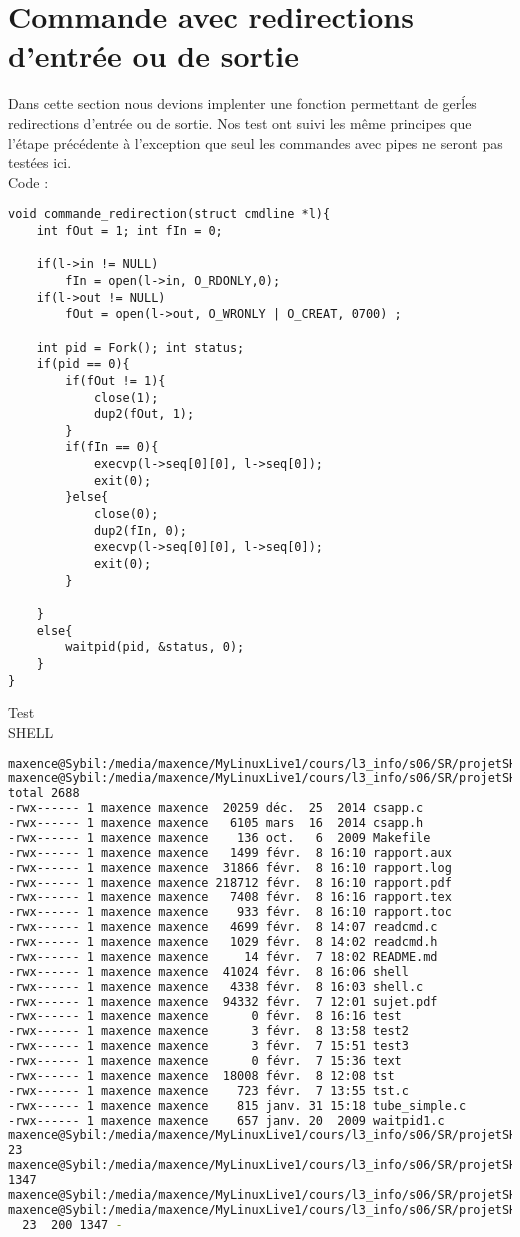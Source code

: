 \documentclass{report}
\begin{document}
		\section{Commande avec redirections d'entr\'ee ou de sortie}
			Dans cette section nous devions implenter une fonction permettant de ger\'les redirections d'entr\'ee ou de sortie. Nos test ont suivi les m\^eme principes que l'\'etape pr\'ec\'edente \`a l'exception que seul les commandes avec pipes ne seront pas test\'ees ici. \\ Code :
			\begin{lstlisting}
void commande_redirection(struct cmdline *l){
	int fOut = 1; int fIn = 0;

	if(l->in != NULL)
		fIn = open(l->in, O_RDONLY,0);
	if(l->out != NULL)
		fOut = open(l->out, O_WRONLY | O_CREAT, 0700) ;

	int pid = Fork(); int status;
	if(pid == 0){
		if(fOut != 1){
			close(1);
			dup2(fOut, 1);
		}
		if(fIn == 0){
			execvp(l->seq[0][0], l->seq[0]);
			exit(0);
		}else{
			close(0);
			dup2(fIn, 0);
			execvp(l->seq[0][0], l->seq[0]);
			exit(0);
		}
		
	}
	else{
		waitpid(pid, &status, 0);
	}
}
			\end{lstlisting}
			Test \\ SHELL
			\begin{lstlisting}[frame=single,basicstyle=\footnotesize,language=bash]
maxence@Sybil:/media/maxence/MyLinuxLive1/cours/l3_info/s06/SR/projetSHELL$ ls -l > test
maxence@Sybil:/media/maxence/MyLinuxLive1/cours/l3_info/s06/SR/projetSHELL$ cat test
total 2688
-rwx------ 1 maxence maxence  20259 déc.  25  2014 csapp.c
-rwx------ 1 maxence maxence   6105 mars  16  2014 csapp.h
-rwx------ 1 maxence maxence    136 oct.   6  2009 Makefile
-rwx------ 1 maxence maxence   1499 févr.  8 16:10 rapport.aux
-rwx------ 1 maxence maxence  31866 févr.  8 16:10 rapport.log
-rwx------ 1 maxence maxence 218712 févr.  8 16:10 rapport.pdf
-rwx------ 1 maxence maxence   7408 févr.  8 16:16 rapport.tex
-rwx------ 1 maxence maxence    933 févr.  8 16:10 rapport.toc
-rwx------ 1 maxence maxence   4699 févr.  8 14:07 readcmd.c
-rwx------ 1 maxence maxence   1029 févr.  8 14:02 readcmd.h
-rwx------ 1 maxence maxence     14 févr.  7 18:02 README.md
-rwx------ 1 maxence maxence  41024 févr.  8 16:06 shell
-rwx------ 1 maxence maxence   4338 févr.  8 16:03 shell.c
-rwx------ 1 maxence maxence  94332 févr.  7 12:01 sujet.pdf
-rwx------ 1 maxence maxence      0 févr.  8 16:16 test
-rwx------ 1 maxence maxence      3 févr.  8 13:58 test2
-rwx------ 1 maxence maxence      3 févr.  7 15:51 test3
-rwx------ 1 maxence maxence      0 févr.  7 15:36 text
-rwx------ 1 maxence maxence  18008 févr.  8 12:08 tst
-rwx------ 1 maxence maxence    723 févr.  7 13:55 tst.c
-rwx------ 1 maxence maxence    815 janv. 31 15:18 tube_simple.c
-rwx------ 1 maxence maxence    657 janv. 20  2009 waitpid1.c
maxence@Sybil:/media/maxence/MyLinuxLive1/cours/l3_info/s06/SR/projetSHELL$ wc -l < test
23
maxence@Sybil:/media/maxence/MyLinuxLive1/cours/l3_info/s06/SR/projetSHELL$ wc -c < test
1347
maxence@Sybil:/media/maxence/MyLinuxLive1/cours/l3_info/s06/SR/projetSHELL$ wc - < test > test2
maxence@Sybil:/media/maxence/MyLinuxLive1/cours/l3_info/s06/SR/projetSHELL$ cat test2
  23  200 1347 -
			\end{lstlisting}
\end{document}

